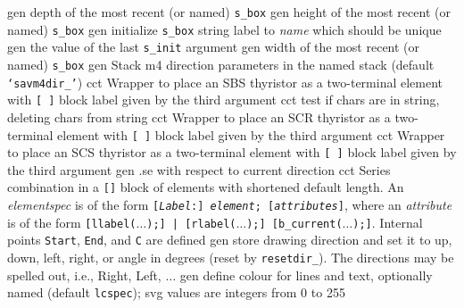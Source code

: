   {gen}
  {depth of the most recent (or named) {\tt s\_box}
    }
  {gen}
  {height of the most recent (or named) {\tt s\_box}
    }
  {gen}
  {initialize {\tt s\_box} string label to {\sl name} which should be unique
    }
  {gen}
  {the value of the last {\tt s\_init} argument
    }
  {gen}
  {width of the most recent (or named) {\tt s\_box}
    }
  {gen}
  {Stack m4 direction parameters in the named stack
    (default {\tt `savm4dir\_'})}
  {cct}
  {Wrapper to place an SBS thyristor as a two-terminal element with
   {\tt [ ]} block label given by the third argument
    }
  {cct}
  {test if chars are in string, deleting chars from string}
  {cct}
  {Wrapper to place an SCR thyristor as a two-terminal element with
   {\tt [ ]} block label given by the third argument
    }
  {cct}
  {Wrapper to place an SCS thyristor as a two-terminal element with
   {\tt [ ]} block label given by the third argument
    }
  {gen}
  {.se with respect to current direction}
  {cct}
  { Series combination in a {\tt []} block of elements
    with shortened default length.  An {\sl elementspec} is of the form
    {\tt [{\sl Label}:] {\sl element}; [{\sl attributes}]},
    where an {\sl attribute} is of the form
    {\tt [llabel($\ldots$);] | [rlabel($\ldots$);] [b\_current($\ldots$);]}.
    Internal points {\tt Start}, {\tt End}, and {\tt C} are defined
    }
  {gen}
  {store drawing direction and set it to
    up, down, left, right, or angle in degrees (reset by {\tt resetdir\_}).
    The directions may be spelled out, i.e., Right, Left, $\ldots$
   }
  {gen}
  {define colour for lines and text, optionally named (default {\tt lcspec});
   svg values are integers from 0 to 255}
